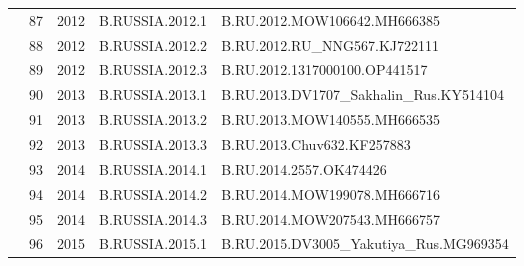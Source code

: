 \begin{table}[htbp]
\begin{tabular}{|cllll|}
\multicolumn{1}{|c|}{}                                  & \multicolumn{1}{l|}{87}          & \multicolumn{1}{l|}{2012}          & \multicolumn{1}{l|}{B.RUSSIA.2012.1}    & B.RU.2012.MOW106642.MH666385             \\ \cline{2-5} 
\multicolumn{1}{|c|}{}                                  & \multicolumn{1}{l|}{88}          & \multicolumn{1}{l|}{2012}          & \multicolumn{1}{l|}{B.RUSSIA.2012.2}    & B.RU.2012.RU\_NNG567.KJ722111            \\ \cline{2-5} 
\multicolumn{1}{|c|}{}                                  & \multicolumn{1}{l|}{89}          & \multicolumn{1}{l|}{2012}          & \multicolumn{1}{l|}{B.RUSSIA.2012.3}    & B.RU.2012.1317000100.OP441517            \\ \cline{2-5} 
\multicolumn{1}{|c|}{}                                  & \multicolumn{1}{l|}{90}          & \multicolumn{1}{l|}{2013}          & \multicolumn{1}{l|}{B.RUSSIA.2013.1}    & B.RU.2013.DV1707\_Sakhalin\_Rus.KY514104 \\ \cline{2-5} 
\multicolumn{1}{|c|}{}                                  & \multicolumn{1}{l|}{91}          & \multicolumn{1}{l|}{2013}          & \multicolumn{1}{l|}{B.RUSSIA.2013.2}    & B.RU.2013.MOW140555.MH666535             \\ \cline{2-5} 
\multicolumn{1}{|c|}{}                                  & \multicolumn{1}{l|}{92}          & \multicolumn{1}{l|}{2013}          & \multicolumn{1}{l|}{B.RUSSIA.2013.3}    & B.RU.2013.Chuv632.KF257883               \\ \cline{2-5} 
\multicolumn{1}{|c|}{}                                  & \multicolumn{1}{l|}{93}          & \multicolumn{1}{l|}{2014}          & \multicolumn{1}{l|}{B.RUSSIA.2014.1}    & B.RU.2014.2557.OK474426                  \\ \cline{2-5} 
\multicolumn{1}{|c|}{}                                  & \multicolumn{1}{l|}{94}          & \multicolumn{1}{l|}{2014}          & \multicolumn{1}{l|}{B.RUSSIA.2014.2}    & B.RU.2014.MOW199078.MH666716             \\ \cline{2-5} 
\multicolumn{1}{|c|}{}                                  & \multicolumn{1}{l|}{95}          & \multicolumn{1}{l|}{2014}          & \multicolumn{1}{l|}{B.RUSSIA.2014.3}    & B.RU.2014.MOW207543.MH666757             \\ \cline{2-5} 
\multicolumn{1}{|c|}{}                                  & \multicolumn{1}{l|}{96}          & \multicolumn{1}{l|}{2015}          & \multicolumn{1}{l|}{B.RUSSIA.2015.1}    & B.RU.2015.DV3005\_Yakutiya\_Rus.MG969354 \\ \cline{2-5} 

\end{tabular}
\end{table}
